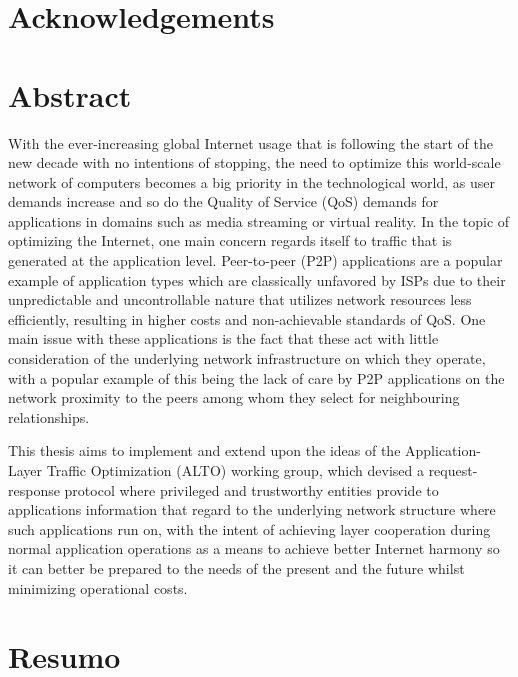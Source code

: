 \documentclass[
  oneside,
  11pt, a4paper,
  footinclude=true,
  headinclude=true,
  cleardoublepage=empty
]{scrbook}
\author{Paulo Edgar Mendes Caldas}
\date{\myear} %
\begin{document}
    
	\umfrontcover
	\umtitlepage
	
	\chapter*{Acknowledgements}

	\chapter*{Abstract}
    With the ever-increasing global Internet usage that is following the start of the new decade with no intentions of stopping, the need to optimize this world-scale network of computers becomes a big priority in the technological world, as user demands increase and so do the Quality of Service (QoS) demands for applications in domains such as media streaming or virtual reality. In the topic of optimizing the Internet, one main concern regards itself to traffic that is generated at the application level. Peer-to-peer (P2P) applications are a popular example of application types which are classically unfavored by ISPs due to their unpredictable and uncontrollable nature that utilizes network resources less efficiently, resulting in higher costs and non-achievable standards of QoS. One main issue with these applications is the fact that these act with little consideration of the underlying network infrastructure on which they operate, with a popular example of this being the lack of care by P2P applications on the network proximity to the peers among whom they select for neighbouring relationships. 
    
    This thesis aims to implement and extend upon the ideas of the Application-Layer Traffic Optimization (ALTO) working group, which devised a request-response protocol where privileged and trustworthy entities provide to applications information that regard to the underlying network structure where such applications run on, with the intent of achieving layer cooperation during normal application operations as a means to achieve better Internet harmony so it can better be prepared to the needs of the present and the future whilst minimizing operational costs.
	
	\clearpage
	\chapter*{Resumo}
	
\end{document}
